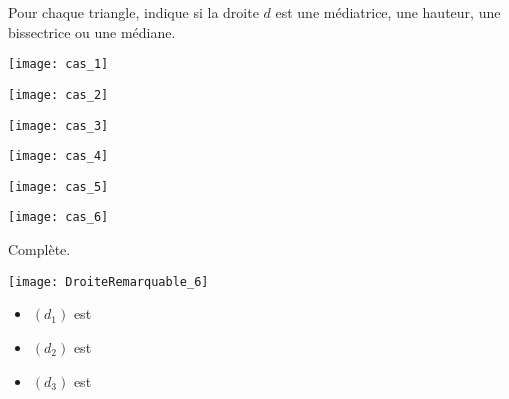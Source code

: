 \vspace{3cm}


\begin{exercice}
Pour chaque triangle, indique si la droite $d$ est une médiatrice, une hauteur, une bissectrice ou une médiane.
\begin{colenumerate}{3}
 \item
 
 \texttt{[image: cas\_1]}

 \dotfill
 \item
 
 \texttt{[image: cas\_2]}

 \dotfill
 \item
 
 \texttt{[image: cas\_3]}

 \dotfill
 \item
 
 \texttt{[image: cas\_4]}

 \dotfill
 \item
 
 \texttt{[image: cas\_5]}

 \dotfill
 \item
 
 \texttt{[image: cas\_6]}

 \dotfill
 \end{colenumerate}
\end{exercice}


\begin{exercice}
Complète.
\begin{center}
 \texttt{[image: DroiteRemarquable\_6]}
\end{center}
\begin{itemize}
\item $(d_1)$ est \dotfill
\item $(d_2)$ est \dotfill
\item $(d_3)$ est \dotfill
\end{itemize}
\end{exercice}


